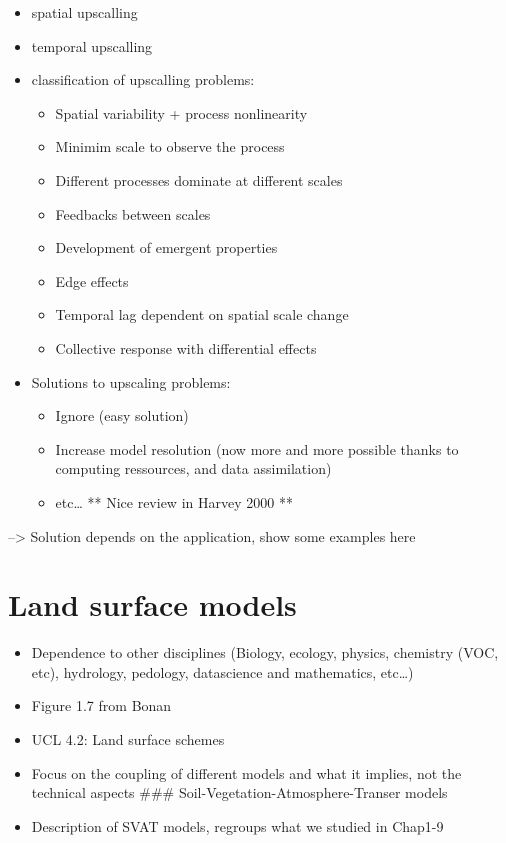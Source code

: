 \documentclass[
  12pt,
  oneside]{book}
\providecommand{\tightlist}{%
  \setlength{\itemsep}{0pt}\setlength{\parskip}{0pt}}
\begin{document}
\begin{itemize}
\tightlist
\item
  spatial upscalling
\item
  temporal upscalling
\item
  classification of upscalling problems:

  \begin{itemize}
  \tightlist
  \item
    Spatial variability + process nonlinearity
  \item
    Minimim scale to observe the process
  \item
    Different processes dominate at different scales
  \item
    Feedbacks between scales
  \item
    Development of emergent properties
  \item
    Edge effects
  \item
    Temporal lag dependent on spatial scale change
  \item
    Collective response with differential effects
  \end{itemize}
\item
  Solutions to upscaling problems:

  \begin{itemize}
  \tightlist
  \item
    Ignore (easy solution)
  \item
    Increase model resolution (now more and more possible thanks to computing ressources, and data assimilation)
  \item
    etc\ldots{} ** Nice review in Harvey 2000 **
  \end{itemize}
\end{itemize}

--\textgreater{} Solution depends on the application, show some examples here

\hypertarget{land-surface-models}{%
\section{Land surface models}\label{land-surface-models}}

\begin{itemize}
\tightlist
\item
  Dependence to other disciplines (Biology, ecology, physics, chemistry (VOC, etc), hydrology, pedology, datascience and mathematics, etc\ldots)
\item
  Figure 1.7 from Bonan
\item
  UCL 4.2: Land surface schemes
\item
  Focus on the coupling of different models and what it implies, not the technical aspects
  \#\#\# Soil-Vegetation-Atmosphere-Transer models
\item
  Description of SVAT models, regroups what we studied in Chap1-9
\end{itemize}
\end{document}
